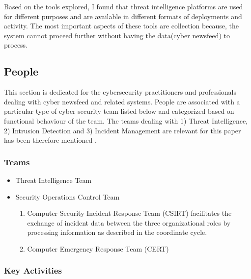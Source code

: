 
 \FloatBarrier

Based on the tools explored, I found that threat intelligence platforms are used for different purposes and are available in different formats of deployments and activity.  The most important aspects of these tools are collection because, the system cannot proceed further without having the data(cyber newsfeed) to process. 

\subsection{People}\label{People}

This section is dedicated for the cybersecurity practitioners 
and professionals dealing with cyber newsfeed and related systems. 
People are associated with a particular type of cyber security team listed below and categorized based on functional behaviour of the team.
The teams dealing with 
1) Threat Intelligence, 
2) Intrusion Detection and 
3) Incident Management 
are relevant for this paper has been therefore mentioned 
\citep{osorno2011coordinated}.

\subsubsection{Teams}

\begin{itemize}
    \item Threat Intelligence Team
    \item Security Operations Control Team
    \begin{enumerate}
       \item Computer Security Incident Response Team (CSIRT) facilitates the exchange of incident data between the three organizational roles by processing information as described in the coordinate cycle.
       \item Computer Emergency Response Team (CERT) 
   \end{enumerate}
\end{itemize}

\subsubsection{Key Activities }

